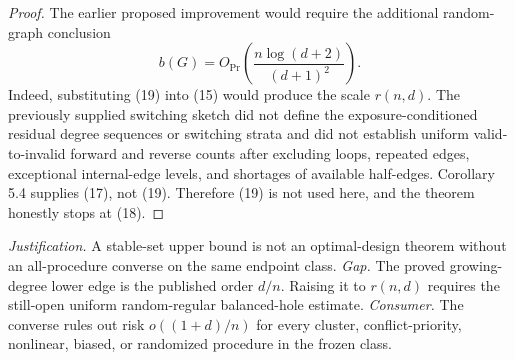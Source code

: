\documentclass{article}
\begin{document}
\begin{proof}
The earlier proposed improvement would require the additional random-graph conclusion
\[
b(G)=O_{\Pr}\!\left(\frac{n\log(d+2)}{(d+1)^2}\right). \tag{19}
\]
Indeed, substituting (19) into (15) would produce the scale \(r(n,d)\).  The previously supplied switching sketch did not define the exposure-conditioned residual degree sequences or switching strata and did not establish uniform valid-to-invalid forward and reverse counts after excluding loops, repeated edges, exceptional internal-edge levels, and shortages of available half-edges.  Corollary 5.4 supplies (17), not (19).  Therefore (19) is not used here, and the theorem honestly stops at (18).
\end{proof}
\par\smallskip\noindent \textit{Justification.} A stable-set upper bound is not an optimal-design theorem without an all-procedure converse on the same endpoint class. \textit{Gap.} The proved growing-degree lower edge is the published order \(d/n\). Raising it to \(r(n,d)\) requires the still-open uniform random-regular balanced-hole estimate. \textit{Consumer.} The converse rules out risk \(o((1+d)/n)\) for every cluster, conflict-priority, nonlinear, biased, or randomized procedure in the frozen class.
\end{document}
